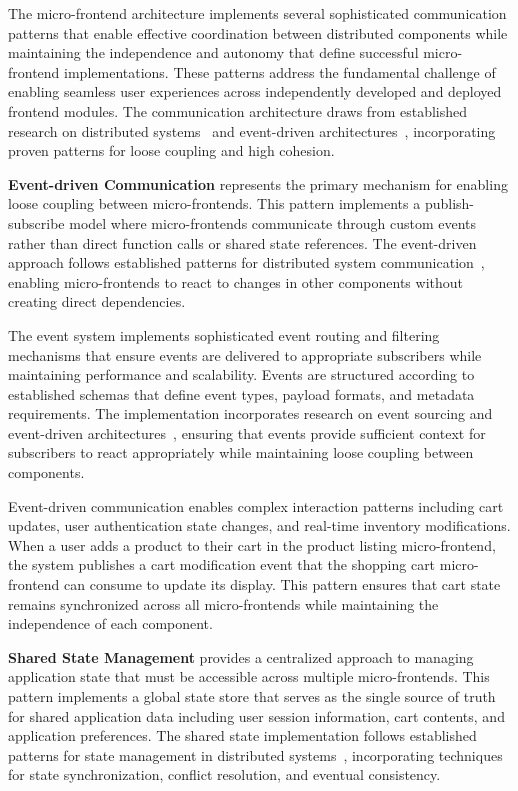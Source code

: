 \documentclass[12pt,a4paper]{report}
\begin{document}
The micro-frontend architecture implements several sophisticated communication patterns that enable effective coordination between distributed components while maintaining the independence and autonomy that define successful micro-frontend implementations. These patterns address the fundamental challenge of enabling seamless user experiences across independently developed and deployed frontend modules. The communication architecture draws from established research on distributed systems~\cite{tanenbaum2007distributed} and event-driven architectures~\cite{hohpe2003enterprise}, incorporating proven patterns for loose coupling and high cohesion.

\textbf{Event-driven Communication} represents the primary mechanism for enabling loose coupling between micro-frontends. This pattern implements a publish-subscribe model where micro-frontends communicate through custom events rather than direct function calls or shared state references. The event-driven approach follows established patterns for distributed system communication~\cite{chappell2010enterprise}, enabling micro-frontends to react to changes in other components without creating direct dependencies.

The event system implements sophisticated event routing and filtering mechanisms that ensure events are delivered to appropriate subscribers while maintaining performance and scalability. Events are structured according to established schemas that define event types, payload formats, and metadata requirements. The implementation incorporates research on event sourcing and event-driven architectures~\cite{fowler2005event}, ensuring that events provide sufficient context for subscribers to react appropriately while maintaining loose coupling between components.

Event-driven communication enables complex interaction patterns including cart updates, user authentication state changes, and real-time inventory modifications. When a user adds a product to their cart in the product listing micro-frontend, the system publishes a cart modification event that the shopping cart micro-frontend can consume to update its display. This pattern ensures that cart state remains synchronized across all micro-frontends while maintaining the independence of each component.

\textbf{Shared State Management} provides a centralized approach to managing application state that must be accessible across multiple micro-frontends. This pattern implements a global state store that serves as the single source of truth for shared application data including user session information, cart contents, and application preferences. The shared state implementation follows established patterns for state management in distributed systems~\cite{lamport1978time}, incorporating techniques for state synchronization, conflict resolution, and eventual consistency.
\end{document}
